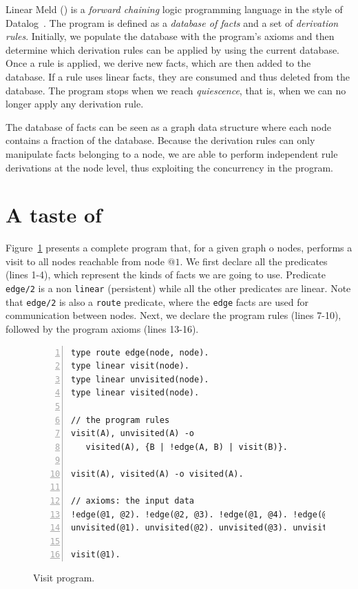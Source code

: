 
Linear Meld (\lang) is a \emph{forward chaining} logic programming language in the style of Datalog~\cite{Ullman:1990:PDK:533142}. The program is defined as a \emph{database of facts} and a set of \emph{derivation rules}.
Initially, we populate the database with the program's axioms and then determine which derivation rules can be applied by using the current database. Once a rule is applied, we derive new facts, which are then added to the database.
If a rule uses linear facts, they are consumed and thus deleted from the database.
The program stops when we reach \emph{quiescence}, that is, when we can no longer
apply any derivation rule.

The database of facts can be seen as a graph data structure where each node contains a
fraction of the database.
Because the derivation rules can only manipulate facts belonging to
a node, we are able to perform independent rule derivations at the node level, thus
exploiting the concurrency in the program.

\section{A taste of \lang}

Figure~\ref{code:visit} presents a complete \lang program that, for a given graph o nodes,
performs a visit to all nodes reachable from node
$@1$. We first declare all the predicates (lines 1-4), which represent the kinds of facts we are going to
use. Predicate \texttt{edge/2} is a non \texttt{linear} (persistent) while all the other predicates are linear.
Note that \texttt{edge/2} is also a \texttt{route} predicate, where the \texttt{edge} facts are used
for communication between nodes. Next, we declare the program rules (lines 7-10), followed by the program
axioms (lines 13-16).

\begin{figure}[h!]
\small\begin{Verbatim}[numbers=left]
type route edge(node, node).
type linear visit(node).
type linear unvisited(node).
type linear visited(node).

// the program rules
visit(A), unvisited(A) -o
   visited(A), {B | !edge(A, B) | visit(B)}.

visit(A), visited(A) -o visited(A).

// axioms: the input data
!edge(@1, @2). !edge(@2, @3). !edge(@1, @4). !edge(@2, @4).
unvisited(@1). unvisited(@2). unvisited(@3). unvisited(@4).

visit(@1).
\end{Verbatim}
  \caption{Visit program.}
  \label{code:visit}
\end{figure}
\normalsize

